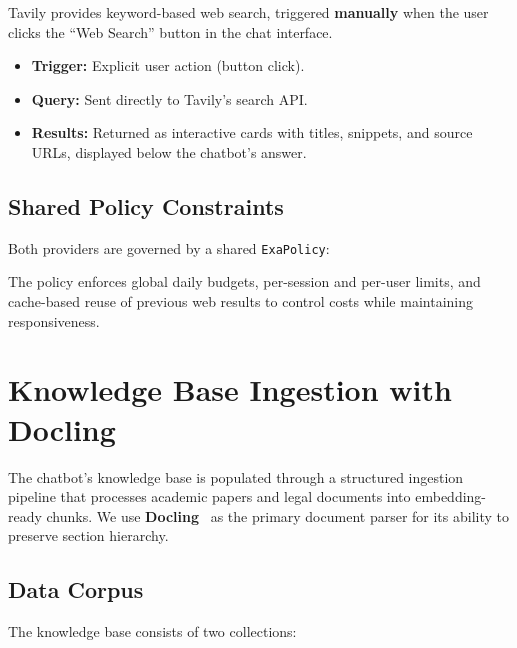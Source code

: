 \documentclass[12pt, a4paper]{article}
\begin{document}
Tavily provides keyword-based web search, triggered \textbf{manually}
when the user clicks the ``Web Search'' button in the chat interface.

\begin{itemize}[leftmargin=2em]
  \item \textbf{Trigger:} Explicit user action (button click).
  \item \textbf{Query:} Sent directly to Tavily's search API.
  \item \textbf{Results:} Returned as interactive cards with titles, snippets,
        and source URLs, displayed below the chatbot's answer.
\end{itemize}

\subsection{Shared Policy Constraints}

Both providers are governed by a shared \texttt{ExaPolicy}:

The policy enforces global daily budgets, per-session and per-user limits,
and cache-based reuse of previous web results to control costs while
maintaining responsiveness.


\section{Knowledge Base Ingestion with Docling}
\label{sec:ingestion}

The chatbot's knowledge base is populated through a structured ingestion
pipeline that processes academic papers and legal documents into
embedding-ready chunks. We use \textbf{Docling}~\cite{docling2024} as the
primary document parser for its ability to preserve section hierarchy.

\subsection{Data Corpus}

The knowledge base consists of two collections:
\end{document}
